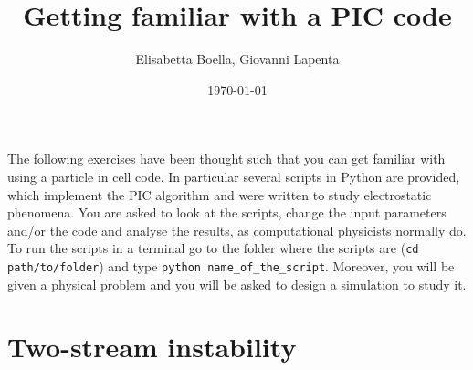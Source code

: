 \documentclass[]{exam}
\title{Getting familiar with a PIC code}
\author{Elisabetta Boella, Giovanni Lapenta}
\date{\today}
\begin{document}
\maketitle

The following exercises have been 	thought such that you can get familiar with using a particle in cell code. In particular several scripts in Python are provided, which implement the PIC algorithm and were written to study electrostatic phenomena. You are asked to look at the scripts, change the input parameters and/or the code and analyse the results, as computational physicists normally do. To run the scripts in a terminal go to the folder where the scripts are (\texttt{cd path/to/folder}) and type \texttt{python name_of_the_script}. Moreover, you will be given a physical problem and you will be asked to design a simulation to study it.

\section{Two-stream instability} \label{prima}
\end{document}
